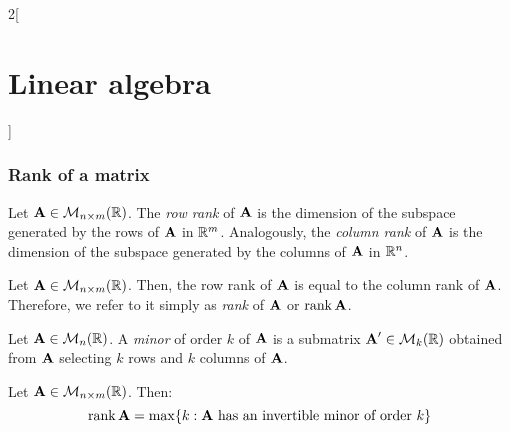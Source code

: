 \documentclass[../../../main.tex]{subfiles}
\begin{document}
\begin{multicols}{2}[\section{Linear algebra}]
  \subsubsection{Rank of a matrix}
  \begin{definition}
    Let $\boldsymbol{\mathrm{A}}\in\mathcal{M}_{n\times m}(\mathbb{R})$. The \emph{row rank} of $\boldsymbol{\mathrm{A}}$ is the dimension of the subspace generated by the rows of $\boldsymbol{\mathrm{A}}$ in $\mathbb{R}^m$. Analogously, the \emph{column rank} of $\boldsymbol{\mathrm{A}}$ is the dimension of the subspace generated by the columns of $\boldsymbol{\mathrm{A}}$ in $\mathbb{R}^n$.
  \end{definition}
  \begin{prop}
    Let $\boldsymbol{\mathrm{A}}\in\mathcal{M}_{n\times m}(\mathbb{R})$. Then, the row rank of $\boldsymbol{\mathrm{A}}$ is equal to the column rank of $\boldsymbol{\mathrm{A}}$. Therefore, we refer to it simply as \emph{rank} of $\boldsymbol{\mathrm{A}}$ or $\rank\boldsymbol{\mathrm{A}}$.
  \end{prop}
  \begin{definition}
    Let $\boldsymbol{\mathrm{A}}\in\mathcal{M}_n(\mathbb{R})$. A \emph{minor} of order $k$ of $\boldsymbol{\mathrm{A}}$ is a submatrix $\boldsymbol{\mathrm{A}}'\in\mathcal{M}_k(\mathbb{R})$ obtained from $\boldsymbol{\mathrm{A}}$ selecting $k$ rows and $k$ columns of $\boldsymbol{\mathrm{A}}$.
  \end{definition}
  \begin{prop}
    Let $\boldsymbol{\mathrm{A}}\in\mathcal{M}_{n\times m}(\mathbb{R})$. Then:
    $$\rank\vectorfunction{A}=\max\{k:\text{$\vectorfunction{A}$\ has an invertible minor of order $k$}\}$$
  \end{prop}

\end{multicols}
\end{document}
